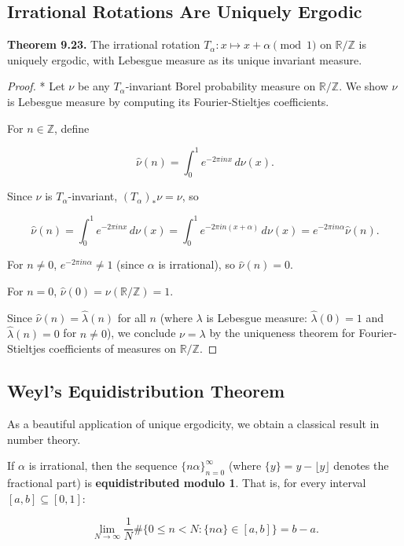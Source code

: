 \subsection{Irrational Rotations Are Uniquely Ergodic}\label{sec:9.8.1}

\textbf{Theorem 9.23.} The irrational rotation $T_\alpha: x \mapsto x + \alpha \pmod{1}$ on $\mathbb{R}/\mathbb{Z}$ is uniquely ergodic, with Lebesgue measure as its unique invariant measure.

\begin{proof}
* Let $\nu$ be any $T_\alpha$-invariant Borel probability measure on $\mathbb{R}/\mathbb{Z}$. We show $\nu$ is Lebesgue measure by computing its Fourier-Stieltjes coefficients.

For $n \in \mathbb{Z}$, define

\[
\hat{\nu}(n) = \int_0^1 e^{-2\pi i n x} \, d\nu(x).
\]

Since $\nu$ is $T_\alpha$-invariant, $(T_\alpha)_*\nu = \nu$, so

\[
\hat{\nu}(n) = \int_0^1 e^{-2\pi i n x} \, d\nu(x) = \int_0^1 e^{-2\pi i n (x + \alpha)} \, d\nu(x) = e^{-2\pi i n \alpha} \hat{\nu}(n).
\]

For $n \neq 0$, $e^{-2\pi i n \alpha} \neq 1$ (since $\alpha$ is irrational), so $\hat{\nu}(n) = 0$.

For $n = 0$, $\hat{\nu}(0) = \nu(\mathbb{R}/\mathbb{Z}) = 1$.

Since $\hat{\nu}(n) = \hat{\lambda}(n)$ for all $n$ (where $\lambda$ is Lebesgue measure: $\hat{\lambda}(0) = 1$ and $\hat{\lambda}(n) = 0$ for $n \neq 0$), we conclude $\nu = \lambda$ by the uniqueness theorem for Fourier-Stieltjes coefficients of measures on $\mathbb{R}/\mathbb{Z}$.
\end{proof}



\subsection{Weyl's Equidistribution Theorem}\label{sec:9.8.2}

As a beautiful application of unique ergodicity, we obtain a classical result in number theory.

\begin{theorem}\label{thm:9.24}
If $\alpha$ is irrational, then the sequence $\{n\alpha\}_{n=0}^\infty$ (where $\{y\} = y - \lfloor y \rfloor$ denotes the fractional part) is \textbf{equidistributed modulo 1}. That is, for every interval $[a, b] \subseteq [0, 1]$:

\[
\lim_{N \to \infty} \frac{1}{N} \#\{0 \leq n < N : \{n\alpha\} \in [a, b]\} = b - a.
\]
\end{theorem}


